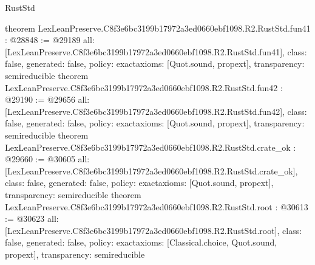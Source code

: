 \begin{lexlean}{RustStd}
\begin{coremodule}
{}
theorem LexLeanPreserve.C8f3e6bc3199b17972a3ed0660ebf1098.R2.RustStd.fun41 : @28848 := @29189 {
  all: [LexLeanPreserve.C8f3e6bc3199b17972a3ed0660ebf1098.R2.RustStd.fun41],
  class: false,
  generated: false,
  policy: exact{axioms: [Quot.sound, propext]},
  transparency: semireducible
}
theorem LexLeanPreserve.C8f3e6bc3199b17972a3ed0660ebf1098.R2.RustStd.fun42 : @29190 := @29656 {
  all: [LexLeanPreserve.C8f3e6bc3199b17972a3ed0660ebf1098.R2.RustStd.fun42],
  class: false,
  generated: false,
  policy: exact{axioms: [Quot.sound, propext]},
  transparency: semireducible
}
theorem LexLeanPreserve.C8f3e6bc3199b17972a3ed0660ebf1098.R2.RustStd.crate_ok : @29660 := @30605 {
  all: [LexLeanPreserve.C8f3e6bc3199b17972a3ed0660ebf1098.R2.RustStd.crate_ok],
  class: false,
  generated: false,
  policy: exact{axioms: [Quot.sound, propext]},
  transparency: semireducible
}
theorem LexLeanPreserve.C8f3e6bc3199b17972a3ed0660ebf1098.R2.RustStd.root : @30613 := @30623 {
  all: [LexLeanPreserve.C8f3e6bc3199b17972a3ed0660ebf1098.R2.RustStd.root],
  class: false,
  generated: false,
  policy: exact{axioms: [Classical.choice, Quot.sound, propext]},
  transparency: semireducible
}


\end{coremodule}
\end{lexlean}
